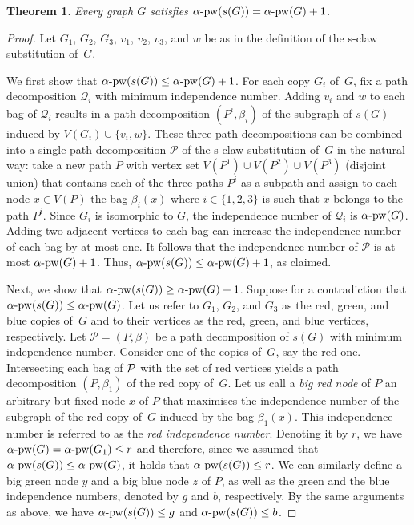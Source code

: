 \documentclass[11pt]{article}
\newcommand{\pw}{\mathrm{pw}}
\newcommand{\s}{s}
\newcommand{\pin}{\alpha \textnormal{-} \pw}
\theoremstyle{plain}
\newtheorem{theorem}{Theorem}[section]
\theoremstyle{definition}
\theoremstyle{remark}
\numberwithin{equation}{section}
\begin{document}
\begin{theorem}\label{increase-path-alpha-by-one}
Every graph $G$ satisfies $\pin(\s(G)) = \pin(G)+1$.
\end{theorem}

\begin{proof}
Let $G_1$, $G_2$, $G_3$, $v_1$, $v_2$, $v_3$, and $w$ be as in the definition of the s-claw substitution of~$G$.

We first show that $\pin(\s(G)) \le \pin(G)+1$.
For each copy $G_i$ of~$G$, fix a path decomposition $\mathcal{Q}_i$ with minimum independence number.
Adding $v_i$ and $w$ to each bag of $\mathcal{Q}_i$ results in a path decomposition $(P^i,\beta_i)$ of the subgraph of $\s(G)$ induced by $V(G_i)\cup\{v_i,w\}$.
These three path decompositions can be combined into a single path decomposition $\mathcal{P}$ of the s-claw substitution of~$G$ in the natural way: take a new path $P$ with vertex set $V(P^1)\cup V(P^2)\cup V(P^3)$ (disjoint union) that contains each of the three paths $P^i$ as a subpath and assign to each node $x\in V(P)$ the bag $\beta_i(x)$ where $i\in \{1,2,3\}$ is such that $x$ belongs to the path $P^i$.
Since $G_i$ is isomorphic to $G$, the independence number of $\mathcal{Q}_i$ is $\pin(G)$.
Adding two adjacent vertices to each bag can increase the independence number of each bag by at most one.
It follows that the independence number of $\mathcal{P}$ is at most $\pin(G)+1$.
Thus, $\pin(\s(G)) \le \pin(G)+1$, as claimed.

Next, we show that $\pin(\s(G)) \ge \pin(G)+1$.
Suppose for a contradiction that $\pin(\s(G)) \le \pin(G)$.
Let us refer to $G_1$, $G_2$, and $G_3$ as the red, green, and blue copies of~$G$ and to their vertices as the red, green, and blue vertices, respectively.
Let $\mathcal{P} =(P,\beta)$ be a path decomposition of $\s(G)$ with minimum independence number.
Consider one of the copies of~$G$, say the red one.
Intersecting each bag of $\cal P$ with the set of red vertices yields a path decomposition $(P,\beta_1)$ of the red copy of~$G$.
Let us call a \emph{big red node} of $P$ an arbitrary but fixed node $x$ of $P$ that maximises the independence number of the subgraph of the red copy of~$G$ induced by the bag $\beta_1(x)$.
This independence number is referred to as the \emph{red independence number}.
Denoting it by $r$, we have $\pin(G) = \pin(G_1)\le r$ and therefore, since we assumed that $\pin(s(G))\le \pin(G)$, it holds that $\pin(\s(G)) \le r$.
We can similarly define a big green node $y$ and a big blue node $z$ of $P$, as well as the green and the blue independence numbers, denoted by $g$ and $b$, respectively.
By the same arguments as above, we have $\pin(\s(G)) \le g$ and $\pin(\s(G)) \le b$.


\end{proof}
\end{document}
